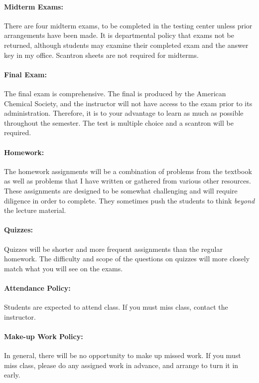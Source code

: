 \documentclass[12pt, letterpaper]{article}
\begin{document}
\paragraph{Midterm Exams:}
There are four midterm exams, to be completed in the testing center unless prior arrangements have been made. It is departmental policy that exams not be returned, although students may examine their completed exam and the answer key in my office. Scantron sheets are not required for midterms.

\paragraph{Final Exam:}
The final exam is comprehensive. The final is produced by the American Chemical Society, and the instructor will not have access to the exam prior to its administration. Therefore, it is to your advantage to learn as much as possible throughout the semester. The test is multiple choice and a scantron will be required.

\paragraph{Homework:}
The homework assignments will be a combination of problems from the textbook as well as problems that I have written or gathered from various other resources. These assignments are designed to be somewhat challenging and will require diligence in order to complete. They sometimes push the students to think \emph{beyond} the lecture material.

\paragraph{Quizzes:}
Quizzes will be shorter and more frequent assignments than the regular homework. The difficulty and scope of the questions on quizzes will more closely match what you will see on the exams.

\paragraph{Attendance Policy:}
Students are expected to attend class. If you must miss class, contact the instructor.

\paragraph{Make-up Work Policy:}
In general, there will be no opportunity to make up missed work. If you must miss class, please do any assigned work in advance, and arrange to turn it in early.
\end{document}
